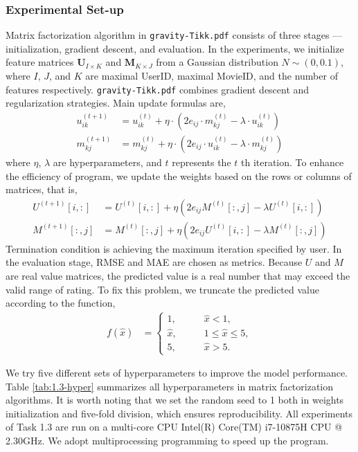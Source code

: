 \documentclass[12pt]{article}
\begin{document}
\subsubsection{Experimental Set-up}
Matrix factorization algorithm in \texttt{gravity-Tikk.pdf} consists of three stages --- initialization, gradient descent, and evaluation. In the experiments, we initialize feature matrices $\mathbf{U}_{I\times K}$ and $\mathbf{M}_{K\times J}$ from a Gaussian distribution $N\sim (0, 0.1)$, where $I$, $J$, and $K$ are maximal UserID, maximal MovieID, and the number of features respectively. \texttt{gravity-Tikk.pdf} combines gradient descent and regularization strategies. Main update formulas are,
\begin{align*}
    u_{ik}^{(t+1)} &= u_{ik}^{(t)} + \eta\cdot\left( 2e_{ij}\cdot m_{kj}^{(t)} - \lambda\cdot u_{ik}^{(t)} \right) \\
    m_{kj}^{(t+1)} &= m_{kj}^{(t)} + \eta\cdot\left( 2e_{ij}\cdot u_{ik}^{(t)} - \lambda \cdot m_{kj}^{(t)} \right) 
\end{align*}
where $\eta$, $\lambda$ are hyperparameters, and $t$ represents the $t$ th iteration. To enhance the efficiency of program, we update the weights based on the rows or columns of matrices, that is,
\begin{align*}
    U^{(t+1)}[i, :] &= U^{(t)}[i, :] + \eta\left( 2e_{ij}M^{(t)}[:, j] - \lambda U^{(t)}[i, :] \right) \\
    M^{(t+1)}[:, j] &= M^{(t)}[:, j] + \eta\left( 2e_{ij}U^{(t)}[i, :] - \lambda M^{(t)}[:, j] \right) 
\end{align*}
Termination condition is achieving the maximum iteration specified by user. In the evaluation stage, RMSE and MAE are chosen as metrics. Because $U$ and $M$ are real value matrices, the predicted value is a real number that may exceed the valid range of rating. To fix this problem, we truncate the predicted value according to the function,
\begin{align*}
    f(\hat{x}) &= 
    \begin{cases}
        1,\qquad &\hat{x} < 1,\\
        \hat{x},\qquad &1\leq \hat{x} \leq 5,\\
        5, \qquad &\hat{x} > 5.
    \end{cases}
\end{align*}
\par
We try five different sets of hyperparameters to improve the model performance. Table \ref{tab:1.3-hyper} summarizes all hyperparameters in matrix factorization algorithms. It is worth noting that we set the random seed to 1 both in weights initialization and five-fold division, which ensures reproducibility. All experiments of Task 1.3 are run on a multi-core CPU Intel(R) Core(TM) i7-10875H CPU @ 2.30GHz. We adopt multiprocessing programming to speed up the program.
\end{document}
